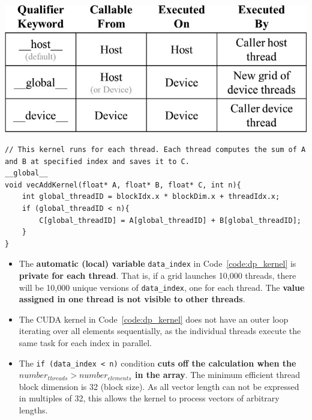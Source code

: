 \begin{center}
    \includegraphics[width=0.7\linewidth]{Images/DP/cuda_keywords.png}
\end{center}

\begin{code}
    \label{code:dp_kernel}
    \begin{verbatim}
// This kernel runs for each thread. Each thread computes the sum of A and B at specified index and saves it to C.
__global__ 
void vecAddKernel(float* A, float* B, float* C, int n){
    int global_threadID = blockIdx.x * blockDim.x + threadIdx.x;
    if (global_threadID < n){
        C[global_threadID] = A[global_threadID] + B[global_threadID];
    }
}
\end{verbatim}
\end{code}
\begin{itemize}
    \item The \textbf{automatic (local) variable} \texttt{data\_index} in Code~\ref{code:dp_kernel} is \textbf{private for each thread}. That is, if a grid launches 10,000 threads, there will be 10,000 unique versions of \texttt{data\_index}, one for each thread. The \textbf{value assigned in one thread is not visible to other threads}.
    \item The CUDA kernel in Code~\ref{code:dp_kernel} does not have an outer loop iterating over all elements sequentially, as the individual threads execute the same task for each index in parallel.
    \item The \texttt{if (data\_index < n)} condition \textbf{cuts off the calculation when the\\$number_{threads} > number_{elements} $ in the array}. The minimum efficient thread block dimension is 32 (block size). As all vector length can not be expressed in multiples of 32, this allows the kernel to process vectors of arbitrary lengths.
\end{itemize}

